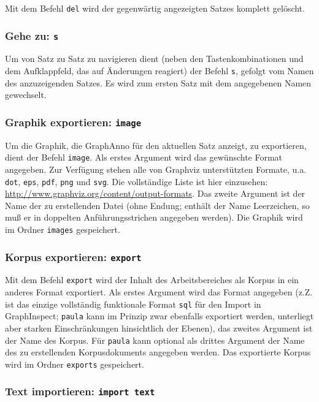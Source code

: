 \documentclass[12pt]{scrartcl}
\begin{document}
Mit dem Befehl \texttt{del} wird der gegenwärtig angezeigten Satzes komplett gelöscht.


\subsubsection{Gehe zu: \texttt{s}}

Um von Satz zu Satz zu navigieren dient (neben den Tastenkombinationen und dem Aufklappfeld, das auf Änderungen reagiert) der Befehl \texttt{s}, gefolgt vom Namen des anzuzeigenden Satzes. Es wird zum ersten Satz mit dem angegebenen Namen gewechselt.


\subsubsection{Graphik exportieren: \texttt{image}}

Um die Graphik, die GraphAnno für den aktuellen Satz anzeigt, zu exportieren, dient der Befehl \texttt{image}. Als erstes Argument wird das gewünschte Format angegeben. Zur Verfügung stehen alle von Graphviz unterstützten Formate, u.a. \texttt{dot}, \texttt{eps}, \texttt{pdf}, \texttt{png} und \texttt{svg}. Die vollständige Liste ist hier einzusehen: \url{http://www.graphviz.org/content/output-formats}. Das zweite Argument ist der Name der zu erstellenden Datei (ohne Endung; enthält der Name Leerzeichen, so muß er in doppelten Anführungsstrichen angegeben werden). Die Graphik wird im Ordner \texttt{images} gespeichert.


\subsubsection{Korpus exportieren: \texttt{export}}\label{befehl-export}

Mit dem Befehl \texttt{export} wird der Inhalt des Arbeitsbereiches als Korpus in ein anderes Format exportiert. Als erstes Argument wird das Format angegeben (z.Z. ist das einzige vollständig funktionale Format \texttt{sql} für den Import in GraphInspect; \texttt{paula} kann im Prinzip zwar ebenfalls exportiert werden, unterliegt aber starken Einschränkungen hinsichtlich der Ebenen), das zweites Argument ist der Name des Korpus. Für \texttt{paula} kann optional als drittes Argument der Name des zu erstellenden Korpusdokuments angegeben werden. Das exportierte Korpus wird im Ordner \texttt{exports} gespeichert.


\subsubsection{Text importieren: \texttt{import text}}
\end{document}
